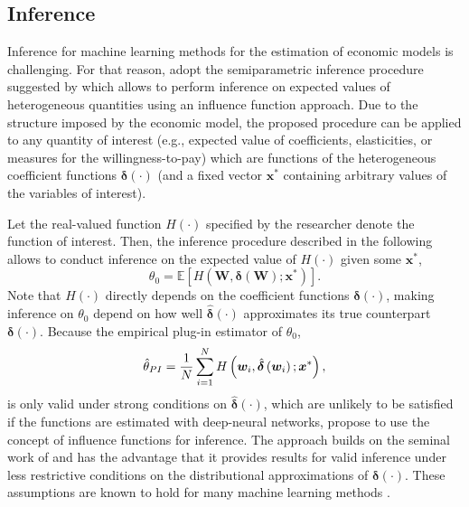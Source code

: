 \documentclass[a4paper, 12pt]{article}
\begin{document}
\subsection{Inference}\label{secDL:inference}

Inference for machine learning methods for the estimation of economic models is challenging. 
For that reason,  adopt the semiparametric inference procedure suggested by  which allows to perform inference on expected values of heterogeneous quantities using an influence function approach. Due to the structure imposed by the economic model, the proposed procedure can be applied to any  quantity of interest (e.g., expected value of coefficients, elasticities, or measures for the willingness-to-pay) which are functions of the heterogeneous coefficient functions $\bm{\delta}(\cdot)$ (and a fixed vector $\bm{x}^{*}$ containing arbitrary values of the variables of interest).

Let the real-valued function $H(\cdot)$ specified by the researcher denote the function of interest. Then, the inference procedure described in the following allows to conduct inference on the expected value of $H(\cdot)$ given some $\bm{x}^{*}$, 
\begin{equation}
\theta_0=\mathbb{E}\left[H\left(\bm{W}, \bm{\delta}\left(\bm{W}\right);\bm{x}^{*}\right)\right].
\end{equation}
Note that $H(\cdot)$ directly depends on the coefficient functions $\bm{\delta}(\cdot)$, making inference on $\theta_0$ depend on how well $\hat{\bm{\delta}}(\cdot)$ approximates its true counterpart $\bm{\delta}(\cdot)$.
Because the empirical plug-in estimator of $\theta_0$,
\begin{equation}
\hat{\theta}_{PI} = \frac{1}{N}\sum\limits_{i=1}^N H\left(\bm{w}_i,\hat{\bm{\delta}}\left(\bm{w}_i\right);\bm{x}^*\right),\notag
\end{equation}
is only valid under strong conditions on  $\hat{\bm{\delta}}(\cdot)$, which are unlikely to be satisfied if the functions are estimated with deep-neural networks,  propose to use the concept of influence functions for inference. The approach builds on the seminal work of  and has the advantage that it provides results for valid inference under less restrictive conditions on the distributional approximations of $\bm{\delta}(\cdot)$. These assumptions are known to hold for many machine learning methods \cite{farrell2020}. 
\end{document}
